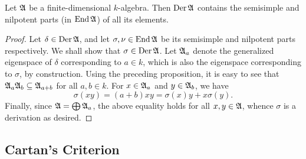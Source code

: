 \begin{proposition}
    Let $\mathfrak{A}$ be a finite-dimensional $k$-algebra. Then $\operatorname{Der}\mathfrak{A}$ contains the semisimple and nilpotent parts (in $\operatorname{End}\mathfrak{A}$) of all its elements.
\end{proposition}
\begin{proof}
    Let $\delta\in\operatorname{Der}\mathfrak{A}$, and let $\sigma,\nu\in\operatorname{End}\mathfrak{A}$ be its semisimple and nilpotent parts respectively. We shall show that $\sigma\in\operatorname{Der}\mathfrak{A}$. Let $\mathfrak{A}_a$ denote the generalized eigenspace of $\delta$ corresponding to $a\in k$, which is also the eigenspace corresponding to $\sigma$, by construction. Using the preceding proposition, it is easy to see that $\mathfrak{A}_a\mathfrak{A}_b\subseteq\mathfrak{A}_{a + b}$ for all $a, b\in k$. For $x\in\mathfrak{A}_a$ and $y\in\mathfrak{A}_b$, we have 
    \begin{equation*}
        \sigma(xy) = (a + b)xy = \sigma(x)y + x\sigma(y).
    \end{equation*}
    Finally, since $\mathfrak{A} = \bigoplus\mathfrak{A}_a$, the above equality holds for all $x,y\in\mathfrak{A}$, whence $\sigma$ is a derivation as desired.
\end{proof}

\subsection{Cartan's Criterion}

